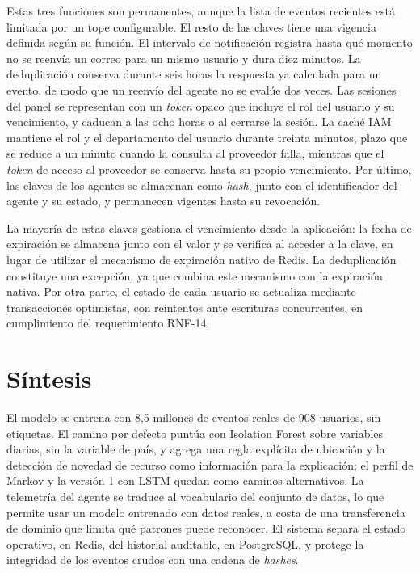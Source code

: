 Estas tres funciones son permanentes, aunque la lista de eventos recientes está limitada por un tope configurable. El resto de las claves tiene una vigencia definida según su función. El intervalo de notificación registra hasta qué momento no se reenvía un correo para un mismo usuario y dura diez minutos. La deduplicación conserva durante seis horas la respuesta ya calculada para un evento, de modo que un reenvío del agente no se evalúe dos veces. Las sesiones del panel se representan con un \emph{token} opaco que incluye el rol del usuario y su vencimiento, y caducan a las ocho horas o al cerrarse la sesión. La caché IAM mantiene el rol y el departamento del usuario durante treinta minutos, plazo que se reduce a un minuto cuando la consulta al proveedor falla, mientras que el \emph{token} de acceso al proveedor se conserva hasta su propio vencimiento. Por último, las claves de los agentes se almacenan como \emph{hash}, junto con el identificador del agente y su estado, y permanecen vigentes hasta su revocación.

La mayoría de estas claves gestiona el vencimiento desde la aplicación: la fecha de expiración se almacena junto con el valor y se verifica al acceder a la clave, en lugar de utilizar el mecanismo de expiración nativo de Redis. La deduplicación constituye una excepción, ya que combina este mecanismo con la expiración nativa. Por otra parte, el estado de cada usuario se actualiza mediante transacciones optimistas, con reintentos ante escrituras concurrentes, en cumplimiento del requerimiento RNF-14.

\section{Síntesis}
\label{sec:sintesis-datos}
El modelo se entrena con 8,5 millones de eventos reales de 908 usuarios, sin etiquetas. El camino por defecto puntúa con Isolation Forest sobre variables diarias, sin la variable de país, y agrega una regla explícita de ubicación y la detección de novedad de recurso como información para la explicación; el perfil de Markov y la versión 1 con LSTM quedan como caminos alternativos. La telemetría del agente se traduce al vocabulario del conjunto de datos, lo que permite usar un modelo entrenado con datos reales, a costa de una transferencia de dominio que limita qué patrones puede reconocer. El sistema separa el estado operativo, en Redis, del historial auditable, en PostgreSQL, y protege la integridad de los eventos crudos con una cadena de \emph{hashes}.
